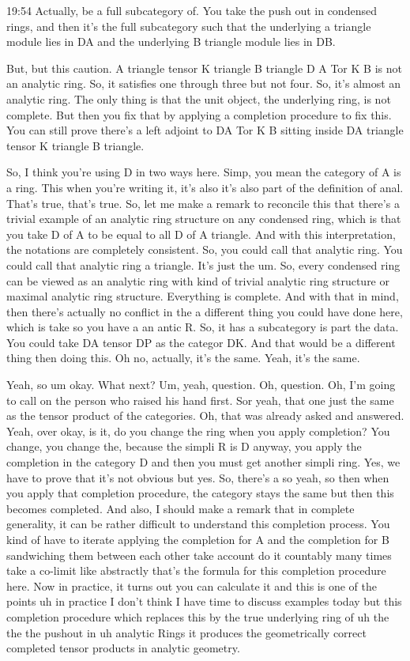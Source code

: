 \begin{unfinished}{19:54}
Actually, be a full subcategory of. You take the push out in condensed rings, and then it's the full subcategory such that the underlying a triangle module lies in DA and the underlying B triangle module lies in DB.

But, but this caution. A triangle tensor K triangle B triangle D A Tor K B is not an analytic ring. So, it satisfies one through three but not four. So, it's almost an analytic ring. The only thing is that the unit object, the underlying ring, is not complete. But then you fix that by applying a completion procedure to fix this. You can still prove there's a left adjoint to DA Tor K B sitting inside DA triangle tensor K triangle B triangle.

So, I think you're using D in two ways here. Simp, you mean the category of A is a ring. This when you're writing it, it's also it's also part of the definition of anal. That's true, that's true. So, let me make a remark to reconcile this that there's a trivial example of an analytic ring structure on any condensed ring, which is that you take D of A to be equal to all D of A triangle. And with this interpretation, the notations are completely consistent. So, you could call that analytic ring. You could call that analytic ring a triangle. It's just the um. So, every condensed ring can be viewed as an analytic ring with kind of trivial analytic ring structure or maximal analytic ring structure. Everything is complete. And with that in mind, then there's actually no conflict in the a different thing you could have done here, which is take so you have a an antic R. So, it has a subcategory is part the data. You could take DA tensor DP as the categor DK. And that would be a different thing then doing this. Oh no, actually, it's the same. Yeah, it's the same.

Yeah, so um okay. What next? Um, yeah, question. Oh, question. Oh, I'm going to call on the person who raised his hand first. Sor yeah, that one just the same as the tensor product of the categories. Oh, that was already asked and answered. Yeah, over okay, is it, do you change the ring when you apply completion? You change, you change the, because the simpli R is D anyway, you apply the completion in the category D and then you must get another simpli ring. Yes, we have to prove that it's not obvious but yes. So, there's a so yeah, so then when you apply that completion procedure, the category stays the same but then this becomes completed. And also, I should make a remark that in complete generality, it can be rather difficult to understand this completion process. You kind of have to iterate applying the completion for A and the completion for B sandwiching them between each other take account do it countably many times take a co-limit like abstractly that's the formula for this completion procedure here. Now in practice, it turns out you can calculate it and this is one of the points uh in practice I don't think I have time to discuss examples today but this completion procedure which replaces this by the true underlying ring of uh the the the pushout in uh analytic Rings it produces the geometrically correct completed tensor products in analytic geometry.


\end{unfinished}
